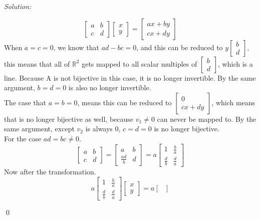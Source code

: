 \documentclass[11 pt]{article}
\newenvironment{sol}
    {\emph{Solution:}
    }
    {
    \qed
    }
\newcommand{\R}{\mathbb{R}} %
\begin{document}
\begin{sol}
\[\begin{bmatrix}
a & b\\c & d
\end{bmatrix}\begin{bmatrix}
x\\y
\end{bmatrix}=\begin{bmatrix}
ax+by\\
cx+dy
\end{bmatrix}\]
When $a = c = 0$, we know that $ad-bc = 0$, and this can be reduced to $y\begin{bmatrix}
b\\d
\end{bmatrix}$, this means that all of $\R^2$ gets mapped to all scalar multiples of $\begin{bmatrix}
b\\d
\end{bmatrix}$, which is a line. Because A is not bijective in this case, it is no longer invertible.
By the same argument, $b=d=0$ is also no longer invertible.\\
The case that $a=b=0$, means this can be reduced to $\begin{bmatrix}
0\\cx+dy
\end{bmatrix}$, which means that is no longer bijective as well, because $v_1\ne 0$ can never be mapped to. By the same argument, except $v_2$ is always 0, $c=d=0$ is no longer bijective.\\
For the case $ad=bc\ne 0$.
\[\begin{bmatrix}
a & b\\c & d
\end{bmatrix}=\begin{bmatrix}
a & b\\\frac{ad}{b}&d
\end{bmatrix}=a\begin{bmatrix}
1 & \frac{b}{a}\\\frac{d}{b} & \frac{d}{a}
\end{bmatrix}\]
Now after the transformation.
\[a\begin{bmatrix}
1 & \frac{b}{a}\\\frac{d}{b} & \frac{d}{a}
\end{bmatrix}\begin{bmatrix}
x\\y
\end{bmatrix}=a\begin{bmatrix}

\end{bmatrix}\]
\end{sol}
\end{document}
